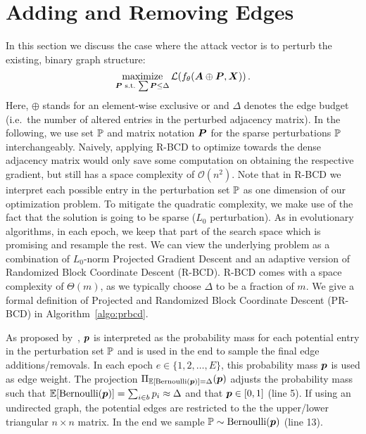 \documentclass[letterpaper]{article} %
\newcommand{\adj}{\mA}
\newcommand{\features}{\mX}
\DeclareMathOperator*{\maximize}{maximize}
\begin{document}
\section{Adding and Removing Edges}\label{sec:prbcd}

In this section we discuss the case where the attack vector is to perturb the existing, binary graph structure:
%
\begin{equation}\label{eq:pgd}
    \maximize_{\mP\,\,\text{s.t.}\, \sum \mP \le \Delta} \mathcal{L}(f_{\theta}(\adj \oplus \mP, \features))\,.
\end{equation}
%
Here, \(\oplus\) stands for an element-wise exclusive or and \(\Delta\) denotes the edge budget (i.e.\ the number of altered entries in the perturbed adjacency matrix). In the following, we use set \({\mathbb{P}}\) and matrix notation \({\bm{P}}\) for the sparse perturbations \({\mathbb{P}}\) interchangeably. Naively, applying R-BCD to optimize towards the dense adjacency matrix would only save some computation on obtaining the respective gradient, but still has a space complexity of \(\mathcal{O}(n^2)\). Note that in R-BCD we interpret each possible entry in the perturbation set \({\mathbb{P}}\) as one dimension of our optimization problem. To mitigate the quadratic complexity, we make use of the fact that the solution is going to be sparse (\(L_0\) perturbation). As in evolutionary algorithms, in each epoch, we keep that part of the search space which is promising and resample the rest. We can view the underlying problem as a combination of \(L_0\)-norm Projected Gradient Descent and an adaptive version of Randomized Block Coordinate Descent (R-BCD). R-BCD comes with a space complexity of \(\Theta(m)\), as we typically choose \(\Delta\) to be a fraction of \(m\). We give a formal definition of Projected and Randomized Block Coordinate Descent (PR-BCD) in Algorithm~\ref{algo:prbcd}.

As proposed by~\citet{Xu2019a}, \({\bm{p}}\) is interpreted as the probability mass for each potential entry in the perturbation set \({\mathbb{P}}\) and is used in the end to sample the final edge additions/removals. In each epoch \(e \in \{1,2, \dots, E\}\), this probability mass \({\bm{p}}\) is used as edge weight. The projection \(\Pi_{\mathbb{E}[\text{Bernoulli}({\bm{p}})] = \Delta} ({\bm{p}})\) adjusts the probability mass such that \(\mathbb{E}[\text{Bernoulli}({\bm{p}})] = \sum_{i \in b} {p}_i \approx \Delta\) and that \({\bm{p}} \in [0, 1]\) (line 5). If using an undirected graph, the potential edges are restricted to the the upper/lower triangular \(n \times n\) matrix. In the end we sample \({\mathbb{P}} \sim \text{Bernoulli}({\bm{p}})\) (line 13).
\end{document}
